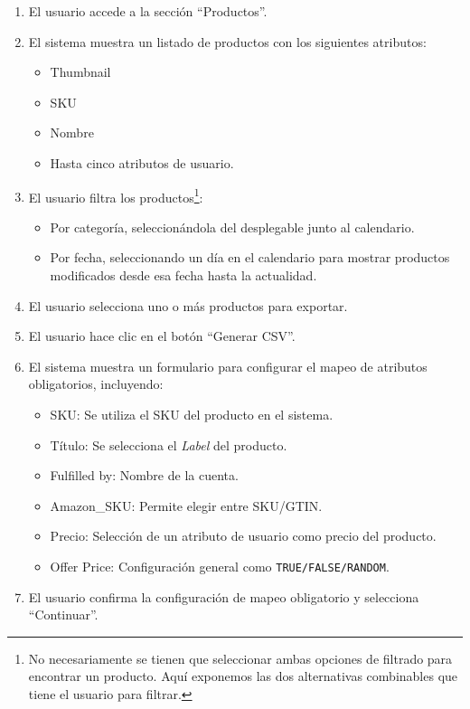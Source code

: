 \begin{enumerate}
    \item El usuario accede a la sección \enquote{Productos}.
    \item El sistema muestra un listado de productos con los siguientes atributos:
    \begin{itemize}
        \item Thumbnail
        \item SKU
        \item Nombre
        \item Hasta cinco atributos de usuario.
    \end{itemize}
    \item El usuario filtra los productos\footnote{No necesariamente se tienen que seleccionar ambas opciones de filtrado para encontrar un producto. Aquí exponemos las dos alternativas combinables que tiene el usuario para filtrar.}:
    \begin{itemize}
        \item Por categoría, seleccionándola del desplegable junto al calendario.
        \item Por fecha, seleccionando un día en el calendario para mostrar productos modificados desde esa fecha hasta la actualidad.
    \end{itemize}
    \item El usuario selecciona uno o más productos para exportar.
    \item El usuario hace clic en el botón \enquote{Generar CSV}.
    \item El sistema muestra un formulario para configurar el mapeo de atributos obligatorios, incluyendo:
    \begin{itemize}
        \item SKU: Se utiliza el SKU del producto en el sistema.
        \item Título: Se selecciona el \textit{Label} del producto.
        \item Fulfilled by: Nombre de la cuenta.
        \item Amazon\_SKU: Permite elegir entre SKU/GTIN.
        \item Precio: Selección de un atributo de usuario como precio del producto.
        \item Offer Price: Configuración general como \texttt{TRUE/FALSE/RANDOM}.
    \end{itemize}
    \item El usuario confirma la configuración de mapeo obligatorio y selecciona \enquote{Continuar}.

\end{enumerate}
